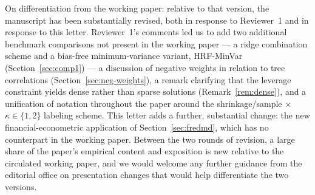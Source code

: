 \documentclass[12pt]{article}
\begin{document}
On differentiation from the working paper: relative to that version, the
manuscript has been substantially revised, both in response to Reviewer~1
and in response to this letter. Reviewer~1's comments led us to add two
additional benchmark comparisons not present in the working paper --- a
ridge combination scheme and a bias-free minimum-variance variant,
HRF-MinVar (Section~\ref{sec:comp1}) --- a discussion of negative weights
in relation to tree correlations (Section~\ref{sec:neg-weights}), a remark
clarifying that the leverage constraint yields dense rather than sparse
solutions (Remark~\ref*{rem:dense}), and a unification of notation
throughout the paper around the shrinkage/sample $\times$ $\kappa \in
\{1,2\}$ labeling scheme. This letter adds a further, substantial change:
the new financial-econometric application of Section~\ref{sec:fredmd},
which has no counterpart in the working paper. Between the two rounds of
revision, a large share of the paper's empirical content and exposition is
new relative to the circulated working paper, and we would welcome any
further guidance from the editorial office on presentation changes that
would help differentiate the two versions.



\end{document}
